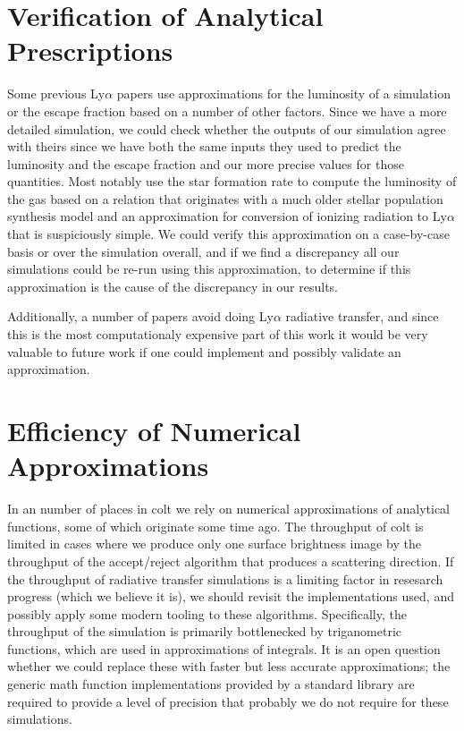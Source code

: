 \section{Verification of Analytical Prescriptions}
Some previous Ly$\alpha$ papers use approximations for the luminosity of a simulation or the escape fraction based on a number of other factors.
Since we have a more detailed simulation, we could check whether the outputs of our simulation agree with theirs since we have both the same inputs they used to predict the luminosity and the escape fraction and our more precise values for those quantities.
Most notably \citet{Cen2013} use the star formation rate to compute the luminosity of the gas based on a relation that originates with a much older stellar population synthesis model and an approximation for conversion of ionizing radiation to Ly$\alpha$ that is suspiciously simple.
We could verify this approximation on a case-by-case basis or over the simulation overall, and if we find a discrepancy all our simulations could be re-run using this approximation, to determine if this approximation is the cause of the discrepancy in our results.

Additionally, a number of papers avoid doing Ly$\alpha$ radiative transfer, and since this is the most computationaly expensive part of this work it would be very valuable to future work if one could implement and possibly validate an approximation.


\section{Efficiency of Numerical Approximations}
In an number of places in {\sc colt} we rely on numerical approximations of analytical functions, some of which originate some time ago.
The throughput of {\sc colt} is limited in cases where we produce only one surface brightness image by the throughput of the accept/reject algorithm that produces a scattering direction.
If the throughput of radiative transfer simulations is a limiting factor in resesarch progress (which we believe it is), we should revisit the implementations used, and possibly apply some modern tooling to these algorithms.
Specifically, the throughput of the simulation is primarily bottlenecked by triganometric functions, which are used in approximations of integrals.
It is an open question whether we could replace these with faster but less accurate approximations; the generic math function implementations provided by a standard library are required to provide a level of precision that probably we do not require for these simulations.

